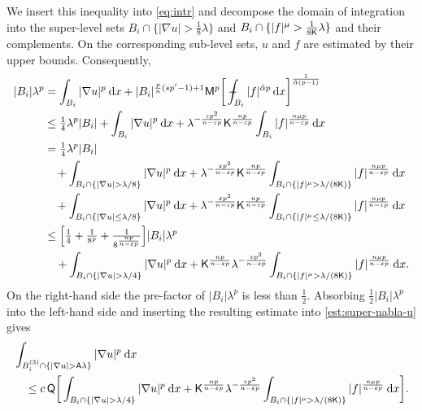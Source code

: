 \documentclass[10pt,letterpaper]{amsart}
\theoremstyle{definition}
\numberwithin{theorem}{section}
\numberwithin{equation}{section}
\newcommand{\mint}{- \mskip-19,5mu \int}
\newcommand{\1}{\ensuremath{\mathds{1}}}
\newcommand{\dx}{\mathrm{d}x}
\renewcommand{\epsilon}{\varepsilon}
\renewcommand{\epsilon}{\varepsilon}
\renewcommand{\d}{\:\! \mathrm{d}}
\numberwithin{equation}{section}
\begin{document}
We insert this inequality into \eqref{eq:intr} and decompose the domain of integration into the super-level sets \(B_i \cap \{|\nabla u| > \tfrac18 \lambda \}\) and \(B_i \cap \{|f|^\mu > \frac{1}{8\sf{K}}\lambda\}\)
and their complements. On the corresponding sub-level sets, $u$ and $f$ are estimated by their upper bounds. Consequently,
\begin{align*}
    |B_i|\lambda^p
    &=
    \int_{B_i} |\nabla u|^p \, \d x + 
   |B_i|^{\frac{p}{n}(sp'- 1)+1 } {\sf M}^p\bigg[\mint_{B_i} |f|^{\tilde\alpha p} \,\dx \bigg]^{\frac{1}{\tilde\alpha(p-1)}} 
    \\
    &\le 
    \tfrac14 \lambda^p|B_i| + 
    \int_{B_i} |\nabla u|^p \, \d x + 
    \lambda^{-\frac{\epsilon p^2}{n-\epsilon p}}
    \mathsf K^{\frac{n p}{n-\epsilon p}}
    \int_{B_i} |f|^{\frac{n\mu p}{n-\epsilon p}} \,\dx
    \\
    &= 
    \tfrac14 \lambda^p|B_i| \\
    &\phantom{\le\,} + 
    \int_{B_i \cap \{|\nabla u| > \lambda/8 \}} |\nabla u|^p \, \d x + 
    \lambda^{-\frac{\epsilon p^2}{n-\epsilon p}}
    \mathsf K^{\frac{n p}{n-\epsilon p}} \int_{B_i \cap \{|f|^\mu > \lambda/(8\mathsf K) \}} |f|^{\frac{n\mu p}{n-\epsilon p}} \, \d x \\
    &\phantom{\le\,} +
    \int_{B_i \cap \{|\nabla u| \le \lambda/8 \}} |\nabla u|^p \, \d x + 
    \lambda^{-\frac{\epsilon p^2}{n-\epsilon p}}
    \mathsf K^{\frac{n p}{n-\epsilon p}} \int_{B_i \cap \{|f|^\mu \le \lambda/(8\mathsf K) \}} |f|^{\frac{n\mu p}{n-\epsilon p}} \, \d x \\
    &\le 
    \Big[ \tfrac14 
    +
    \tfrac1{8^p}
    +
    \tfrac{1}{8^{\frac{np}{n-\epsilon p}}}\Big]
    |B_i| \lambda^p \\
    &\quad + 
    \int_{B_i \cap \{|\nabla u| > \lambda/4 \}} |\nabla u|^p \, \d x + 
    \mathsf K^{\frac{n p}{n-\epsilon p}} 
    \lambda^{-\frac{\epsilon p^2}{n-\epsilon p}}
    \int_{B_i \cap \{|f|^\mu > \lambda/(8\mathsf K) \}} |f|^{\frac{n\mu p}{n-\epsilon p}} \, \d x .
\end{align*}
On the right-hand side the  pre-factor of $|B_i|\lambda^p$ is less than $\frac12$. Absorbing
$\tfrac12 |B_i|\lambda^p$
into the left-hand side and inserting the resulting estimate into \eqref{est:super-nabla-u} gives
\begin{align*}
    &\int_{B_i^{(3)}\cap \left\{ |\nabla u| > \mathsf A \lambda \right\}} |\nabla u|^p \, \d x \\
    &\quad\leq 
    c\,{\sf Q}
    \bigg[\int_{B_i \cap \{|\nabla u| > \lambda/4 \}} |\nabla u|^p \, \d x + 
    \mathsf K^{\frac{n p}{n-\epsilon p}} 
    \lambda^{-\frac{\epsilon p^2}{n-\epsilon p}}
    \int_{B_i \cap \{|f|^\mu > \lambda/(8\mathsf K) \}} |f|^{\frac{n\mu p}{n-\epsilon p}} \, \d x \bigg].
\end{align*}
\end{document}
